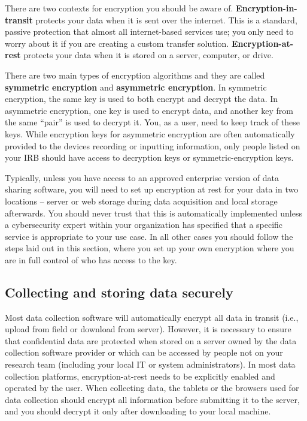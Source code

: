 There are two contexts for encryption you should be aware of.
\textbf{Encryption-in-transit} protects your data 
when it is sent over the internet.
This is a standard, passive protection that almost all internet-based services use;
you only need to worry about it if you are creating a custom transfer solution.
\textbf{Encryption-at-rest} protects your data 
when it is stored on a server, computer, or drive.

There are two main types of encryption algorithms and they are called
\textbf{symmetric encryption}
and \textbf{asymmetric encryption}.
In symmetric encryption,
the same key is used to both encrypt and decrypt the data.
In asymmetric encryption, one key is used to encrypt data,
and another key from the same ``pair'' is used to decrypt it.
You, as a user, need to keep track of these keys.
While encryption keys for asymmetric encryption are often
automatically provided to the devices recording or inputting information,
only people listed on your IRB should have access to decryption keys
or symmetric-encryption keys.

Typically, unless you have access to an approved
enterprise version of data sharing software,
you will need to set up encryption at rest for your data
in two locations --
server or web storage during data acquisition and local storage afterwards.
You should never trust that this is automatically implemented
unless a cybersecurity expert within your organization
has specified that a specific service is appropriate to your use case.
In all other cases you should follow the steps laid out in this section,
where you set up your own encryption
where you are in full control of who has access to the key.

\subsection{Collecting and storing data securely}

Most data collection software will automatically encrypt
all data in transit (i.e., upload from field or download from server).
However, it is necessary to ensure that confidential data
are protected when stored on a server
owned by the data collection software provider
or which can be accessed by people not on your research team
(including your local IT or system administrators).
In most data collection platforms,
encryption-at-rest needs to be explicitly enabled and operated by the user.
When collecting data, the tablets or the browsers used for data collection
should encrypt all information before submitting it to the server,
and you should decrypt it only after downloading to your local machine.

